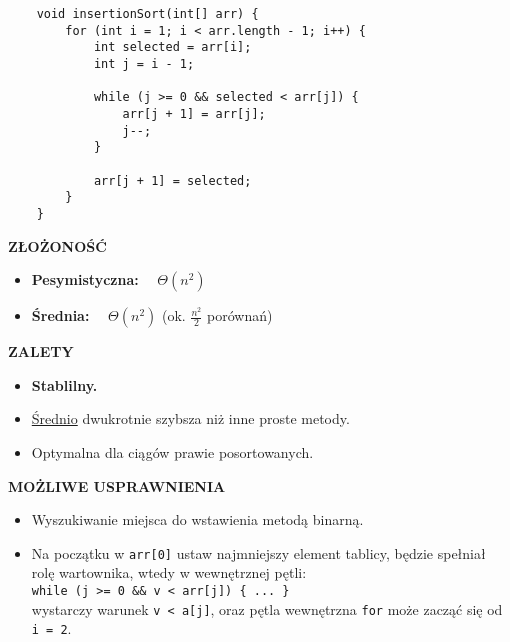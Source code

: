 \documentclass[simple-sorts.tex]{subfiles}
\begin{document}
    \begin{verbatim}
    void insertionSort(int[] arr) {
        for (int i = 1; i < arr.length - 1; i++) {
            int selected = arr[i];
            int j = i - 1;

            while (j >= 0 && selected < arr[j]) {
                arr[j + 1] = arr[j];
                j--;
            }

            arr[j + 1] = selected;
        }
    }
    \end{verbatim}

    \textbf{ZŁOŻONOŚĆ}
    \begin{itemize}
        \item \textbf{Pesymistyczna:} ~~$\Theta(n^2)$
        \item \textbf{Średnia:} ~~$\Theta(n^2)$ (ok. $\frac{n^2}{2}$ porównań)
    \end{itemize}

    \textbf{ZALETY}
    \begin{itemize}
        \item \textbf{Stablilny.}
        \item \underline{Średnio} dwukrotnie szybsza niż inne proste metody.
        \item Optymalna dla ciągów prawie posortowanych.
    \end{itemize}


    \textbf{MOŻLIWE USPRAWNIENIA}
    \begin{itemize}
        \item Wyszukiwanie miejsca do wstawienia metodą binarną.
        \item Na początku w \texttt{arr[0]} ustaw najmniejszy element tablicy,
            będzie spełniał rolę wartownika, wtedy w wewnętrznej pętli:\\
            \texttt{while (j >= 0 \&\& v < arr[j]) \{ ... \}}\\
            wystarczy warunek \texttt{v < a[j]}, oraz pętla wewnętrzna
            \texttt{for} może zacząć się od \texttt{i = 2}.
    \end{itemize}
\end{document}
